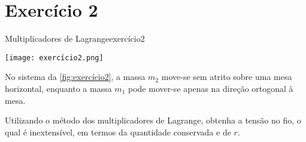 \section*{Exercício 2}
\begin{exercício}{Multiplicadores de Lagrange}{exercício2}
    \begin{center}
        \texttt{[image: exercício2.png]}
    \end{center}

    No sistema da \cref{fig:exercício2}, a massa \(m_2\) move-se sem atrito sobre uma mesa horizontal, enquanto a massa \(m_1\) pode mover-se apenas na direção ortogonal à mesa.

    Utilizando o método dos multiplicadores de Lagrange, obtenha a tensão no fio, o qual é inextensível, em termos da quantidade conservada e de \(r\).
\end{exercício}
